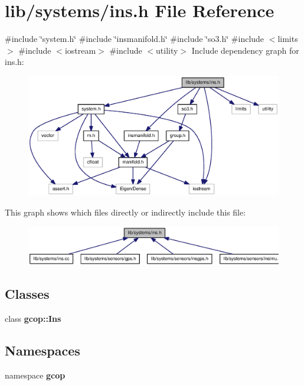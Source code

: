 \section{lib/systems/ins.h \-File \-Reference}
\label{ins_8h}
{\ttfamily \#include \char`\"{}system.\-h\char`\"{}}\*
{\ttfamily \#include \char`\"{}insmanifold.\-h\char`\"{}}\*
{\ttfamily \#include \char`\"{}so3.\-h\char`\"{}}\*
{\ttfamily \#include $<$limits$>$}\*
{\ttfamily \#include $<$iostream$>$}\*
{\ttfamily \#include $<$utility$>$}\*
\-Include dependency graph for ins.\-h\-:
\nopagebreak
\begin{figure}[H]
\begin{center}
\leavevmode
\includegraphics[width=350pt]{ins_8h__incl}
\end{center}
\end{figure}
\-This graph shows which files directly or indirectly include this file\-:
\nopagebreak
\begin{figure}[H]
\begin{center}
\leavevmode
\includegraphics[width=350pt]{ins_8h__dep__incl}
\end{center}
\end{figure}
\subsection*{\-Classes}
\begin{DoxyCompactItemize}
\item 
class {\bf gcop\-::\-Ins}
\end{DoxyCompactItemize}
\subsection*{\-Namespaces}
\begin{DoxyCompactItemize}
\item 
namespace {\bf gcop}
\end{DoxyCompactItemize}
